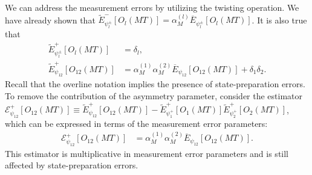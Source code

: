 \documentclass[%
 reprint,
superscriptaddress,
 amsmath,amssymb,
 aps,
pra,
floatfix,
]{revtex4-2}
\begin{document}
We can address the measurement errors by utilizing the twisting operation. We have already shown that $\tilde{E}^-_{\psi^\pm_{l}}[O_l(MT)]=\alpha_M^{(l)}\overline{E}_{\psi_l^\pm}[O_l(MT)]$. It is also true that
\begin{align}
    \tilde{E}^+_{\psi^\pm_{l}}[O_l(MT)]&=\delta_l,\\
    \tilde{E}^+_{\psi_{12}}[O_{12}(MT)]&=\alpha_M^{(1)}\alpha_M^{(2)}\overline{E}_{\psi_{12}}[O_{12}(MT)]+\delta_1\delta_2.
\end{align}
Recall that the overline notation implies the presence of state-preparation errors. To remove the contribution of the asymmetry parameter, consider the estimator $\mathcal{E}^+_{\psi_{12}}[O_{12}(MT)]\equiv\tilde{E}^+_{\psi_{12}}[O_{12}(MT)]-\tilde{E}^+_{\psi^+_{1}}[O_1(MT)]\tilde{E}^+_{\psi^+_{2}}[O_2(MT)]$, which can be expressed in terms of the measurement error parameters:
\begin{align}
    \mathcal{E}^+_{\psi_{12}}[O_{12}(MT)]&=\alpha_M^{(1)}\alpha_M^{(2)}\overline{E}_{\psi_{12}}[O_{12}(MT)].
\end{align}
This estimator is multiplicative in measurement error parameters and is still affected by state-preparation errors.
\end{document}

